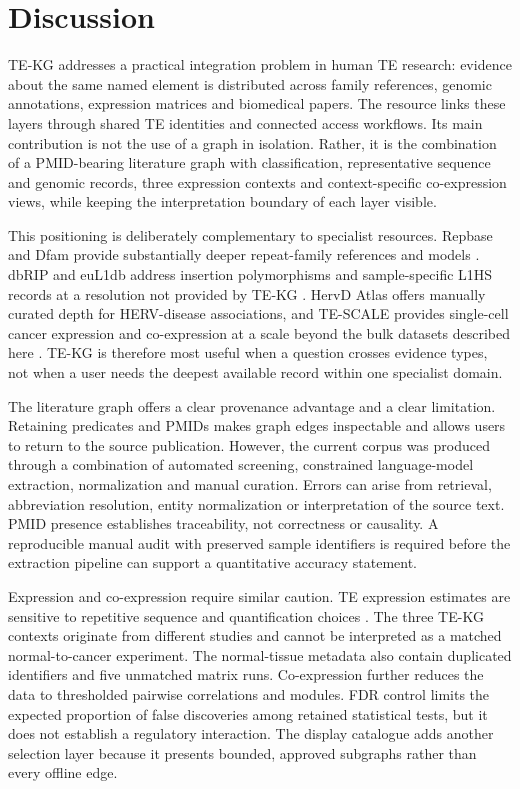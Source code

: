\section{Discussion}

TE-KG addresses a practical integration problem in human TE research: evidence about the same named element is distributed across family references, genomic annotations, expression matrices and biomedical papers. The resource links these layers through shared TE identities and connected access workflows. Its main contribution is not the use of a graph in isolation. Rather, it is the combination of a PMID-bearing literature graph with classification, representative sequence and genomic records, three expression contexts and context-specific co-expression views, while keeping the interpretation boundary of each layer visible.

This positioning is deliberately complementary to specialist resources. Repbase and Dfam provide substantially deeper repeat-family references and models \citep{Bao2015Repbase,Wheeler2013Dfam}. dbRIP and euL1db address insertion polymorphisms and sample-specific L1HS records at a resolution not provided by TE-KG \citep{Wang2006dbRIP,Mir2015euL1db}. HervD Atlas offers manually curated depth for HERV-disease associations, and TE-SCALE provides single-cell cancer expression and co-expression at a scale beyond the bulk datasets described here \citep{Li2024HervDAtlas,Meng2026TESCALE}. TE-KG is therefore most useful when a question crosses evidence types, not when a user needs the deepest available record within one specialist domain.

The literature graph offers a clear provenance advantage and a clear limitation. Retaining predicates and PMIDs makes graph edges inspectable and allows users to return to the source publication. However, the current corpus was produced through a combination of automated screening, constrained language-model extraction, normalization and manual curation. Errors can arise from retrieval, abbreviation resolution, entity normalization or interpretation of the source text. PMID presence establishes traceability, not correctness or causality. A reproducible manual audit with preserved sample identifiers is required before the extraction pipeline can support a quantitative accuracy statement.

Expression and co-expression require similar caution. TE expression estimates are sensitive to repetitive sequence and quantification choices \citep{Lanciano2020TEExpression}. The three TE-KG contexts originate from different studies and cannot be interpreted as a matched normal-to-cancer experiment. The normal-tissue metadata also contain duplicated identifiers and five unmatched matrix runs. Co-expression further reduces the data to thresholded pairwise correlations and modules. FDR control limits the expected proportion of false discoveries among retained statistical tests, but it does not establish a regulatory interaction. The display catalogue adds another selection layer because it presents bounded, approved subgraphs rather than every offline edge.

